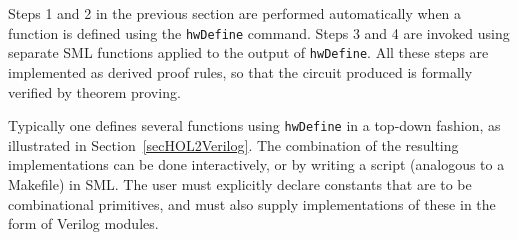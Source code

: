 
Steps 1 and 2 in the previous section are performed automatically when
a function is defined using the \texttt{hwDefine} command.  Steps 3
and 4 are invoked using separate SML functions applied to the output
of \texttt{hwDefine}. All these steps are implemented as derived proof
rules, so that the circuit produced is formally verified by theorem
proving.


Typically one defines several functions using \texttt{hwDefine} in a
top-down fashion, as illustrated in Section~\ref{secHOL2Verilog}.  The
combination of the resulting implementations can be done
interactively, or by writing a script (analogous to a Makefile) in
SML. The user must explicitly declare constants that are to be
combinational primitives, and must also supply implementations of
these in the form of Verilog modules.

